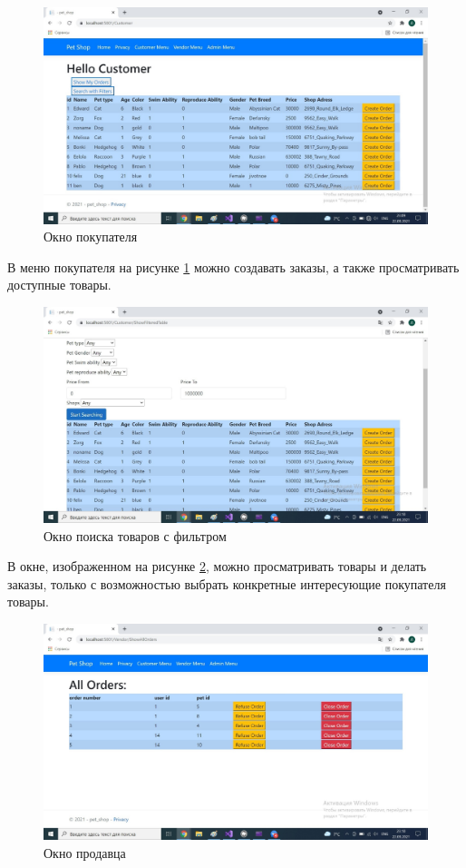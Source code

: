 \begin{figure}[ht!]
  \centering
  \includegraphics[scale=0.9]{interface3.png}
  \caption{Окно покупателя}
  \label{fig:interface3}
\end{figure}

В меню покупателя на рисунке \ref{fig:interface3} можно создавать заказы, а также просматривать доступные товары.

\begin{figure}[ht!]
  \centering
  \includegraphics[scale=0.9]{interface4.png}
  \caption{Окно поиска товаров с фильтром}
  \label{fig:interface4}
\end{figure}

В окне, изображенном на рисунке \ref{fig:interface4}, можно просматривать товары и делать заказы, только с возможностью выбрать конкретные интересующие покупателя товары.

\newpage

\begin{figure}[ht!]
  \centering
  \includegraphics[scale=0.9]{interface5.png}
  \caption{Окно продавца}
  \label{fig:interface5}
\end{figure}

